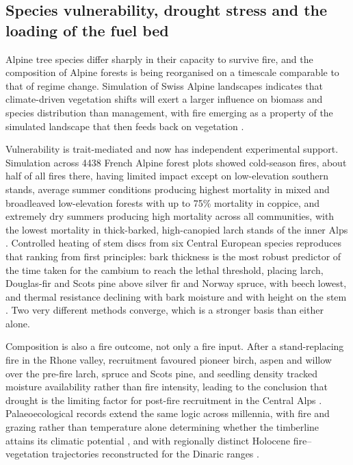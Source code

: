 \documentclass[11pt,a4paper]{article}
\begin{document}
\subsection{Species vulnerability, drought stress and the loading of the fuel bed}

Alpine tree species differ sharply in their capacity to survive fire, and the composition of Alpine forests is being reorganised on a timescale comparable to that of regime change. Simulation of Swiss Alpine landscapes indicates that climate-driven vegetation shifts will exert a larger influence on biomass and species distribution than management, with fire emerging as a property of the simulated landscape that then feeds back on vegetation \citep{schumacher_relative_2006}.

Vulnerability is trait-mediated and now has independent experimental support. Simulation across 4438 French Alpine forest plots showed cold-season fires, about half of all fires there, having limited impact except on low-elevation southern stands, average summer conditions producing highest mortality in mixed and broadleaved low-elevation forests with up to 75\% mortality in coppice, and extremely dry summers producing high mortality across all communities, with the lowest mortality in thick-barked, high-canopied larch stands of the inner Alps \citep{dupire_vulnerability_2019}. Controlled heating of stem discs from six Central European species reproduces that ranking from first principles: bark thickness is the most robust predictor of the time taken for the cambium to reach the lethal threshold, placing larch, Douglas-fir and Scots pine above silver fir and Norway spruce, with beech lowest, and thermal resistance declining with bark moisture and with height on the stem \citep{mutterer_bark_2026}. Two very different methods converge, which is a stronger basis than either alone.

Composition is also a fire outcome, not only a fire input. After a stand-replacing fire in the Rhone valley, recruitment favoured pioneer birch, aspen and willow over the pre-fire larch, spruce and Scots pine, and seedling density tracked moisture availability rather than fire intensity, leading to the conclusion that drought is the limiting factor for post-fire recruitment in the Central Alps \citep{moser_potential_2010}. Palaeoecological records extend the same logic across millennia, with fire and grazing rather than temperature alone determining whether the timberline attains its climatic potential \citep{colombaroli_species_2010}, and with regionally distinct Holocene fire--vegetation trajectories reconstructed for the Dinaric ranges \citep{cagliero_effect_nodate}.
\end{document}
